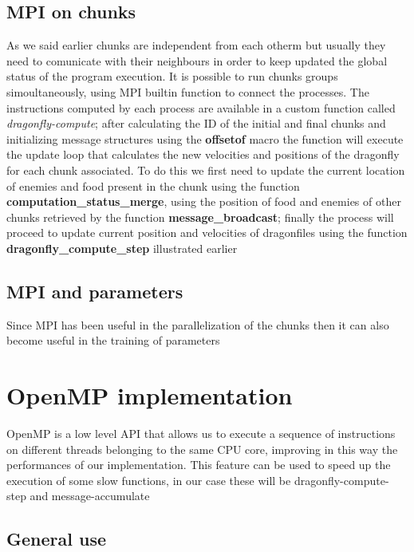 \documentclass[10pt]{article}
\begin{document}
\begin{multicols}{2}
\subsection*{MPI on chunks}
As we said earlier chunks are independent from each otherm but usually they need to comunicate
with their neighbours in order to keep updated the global status of the program execution. 
It is possible to run chunks groups simoultaneously, using MPI builtin function to connect 
the processes.  The instructions computed by each process are available in a custom function
called \textit{dragonfly-compute}; after calculating the ID of the initial and final chunks
and initializing message structures using the \textbf{offsetof} macro
the function will execute the update loop that calculates the new velocities and positions 
of the dragonfly for each chunk associated. To do this we first need to update the current
location of enemies and food present in the chunk using the function \textbf{computation\_status\_merge},
using the position of food and enemies of other chunks retrieved by the function \textbf{message\_broadcast};
finally the process will proceed to update current position and velocities of dragonfiles using 
the function \textbf{dragonfly\_compute\_step} illustrated earlier

\subsection*{MPI and parameters}
Since MPI has been useful in the parallelization of the chunks then it can also become useful in
the training of parameters

\section{OpenMP implementation}

OpenMP is a low level API that allows us to execute a sequence of instructions on different threads belonging
to the same CPU core, improving in this way the performances of our implementation. This feature can be used to 
speed up the execution of some slow functions, in our case these will be dragonfly-compute-step and message-accumulate

\subsection*{General use}


\end{multicols}
\end{document}
